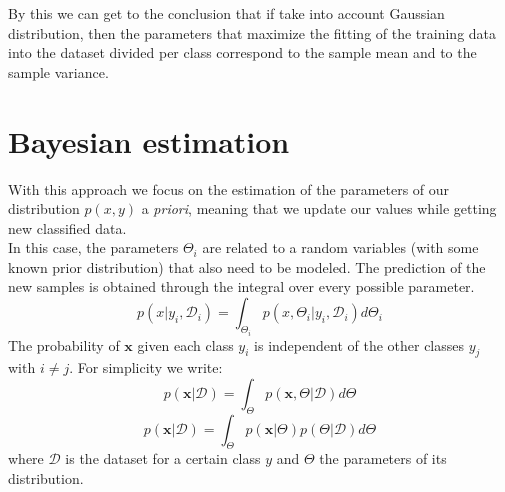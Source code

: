     	By this we can get to the conclusion that if take into account Gaussian distribution, then the parameters that maximize the fitting of the training data into the dataset divided per class correspond to the sample mean and to the sample variance.
    	
    	
\section{Bayesian estimation}
    \label{par:Bayesian_estimation}
    With this approach we focus on the estimation of the parameters of our distribution $p(x, y)$ a \textit{priori}, meaning that we update our values while getting new classified data.\\
    In this case, the parameters $\Theta_i$ are related to a random variables (with some known prior distribution) that also need to be modeled. The prediction of the new samples is obtained through the integral over every possible parameter.
    $$p(x|y_i, \mathcal{D}_i) = \int_{\Theta_i} p(x, \Theta_i|y_i, \mathcal{D}_i) d\Theta_i$$
    The probability of $\pmb{x}$ given each class $y_i$ is independent of the other classes $y_j$ with $i \neq j$. For simplicity we write:
    $$p(\pmb{x}|\mathcal{D}) = \int_{\Theta} p(\pmb{x}, \Theta|\mathcal{D}) d\Theta$$
    $$p(\pmb{x}|\mathcal{D}) = \int_{\Theta} p(\pmb{x} |\Theta) p(\Theta | \mathcal{D}) d\Theta$$ 
    where $\mathcal{D}$ is the dataset for a certain class $y$ and $\Theta$ the parameters of its distribution.\\
    
